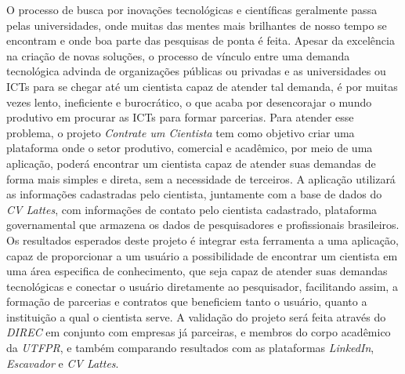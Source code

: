 \begin{resumoutfpr}
    O processo de busca por inovações tecnológicas e científicas geralmente passa pelas universidades, onde muitas das mentes mais brilhantes de nosso tempo se encontram e onde boa parte das pesquisas de ponta é feita. Apesar da excelência na criação de novas soluções, o processo de vínculo entre uma demanda tecnológica advinda de organizações públicas ou privadas e as universidades ou ICTs para se chegar até um cientista capaz de atender tal demanda, é por muitas vezes lento, ineficiente e burocrático, o que acaba por desencorajar o mundo produtivo em procurar as ICTs para formar parcerias. Para atender esse problema, o projeto \emph{Contrate um Cientista} tem como objetivo criar uma plataforma onde o setor produtivo, comercial e acadêmico, por meio de uma aplicação, poderá encontrar um cientista capaz de atender suas demandas de forma mais simples e direta, sem a necessidade de terceiros.
    A aplicação utilizará as informações cadastradas pelo cientista, juntamente com a base de dados do \emph{CV Lattes}, com informações de contato pelo cientista cadastrado, plataforma governamental que armazena os dados de pesquisadores e profissionais brasileiros. Os resultados esperados deste projeto é integrar esta ferramenta a uma aplicação, capaz de proporcionar a um usuário a possibilidade de encontrar um cientista em uma área especifica de conhecimento, que seja capaz de atender suas demandas tecnológicas e conectar o usuário diretamente ao pesquisador, facilitando assim, a formação de parcerias e contratos que beneficiem tanto o usuário, quanto a instituição a qual o cientista serve. A validação do projeto será feita através do \emph{DIREC} em conjunto com empresas já parceiras, e membros do corpo acadêmico da \emph{UTFPR}, e também comparando resultados com as plataformas \emph{LinkedIn}, \emph{Escavador} e \emph{CV Lattes}.
\end{resumoutfpr}
